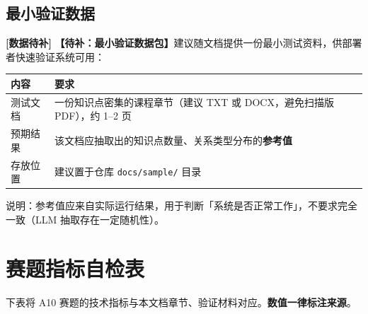 \documentclass[UTF8,a4paper,11pt]{ctexrep}
\newcommand{\todomark}{\textcolor{todobar}{\textbf{[数据待补]}}}
\begin{document}
\subsection{最小验证数据}

\begin{todobox}
\todomark{} \textbf{【待补：最小验证数据包】}建议随文档提供一份最小测试资料，供部署者快速验证系统可用：

\begin{center}
\small
\begin{tabularx}{\linewidth}{@{}XX@{}}
\toprule
内容 & 要求 \\
\midrule
测试文档 & 一份知识点密集的课程章节（建议 TXT 或 DOCX，避免扫描版 PDF），约 1–2 页 \\
预期结果 & 该文档应抽取出的知识点数量、关系类型分布的\textbf{参考值} \\
存放位置 & 建议置于仓库 \texttt{docs/sample/} 目录 \\
\bottomrule
\end{tabularx}
\end{center}
说明：参考值应来自实际运行结果，用于判断「系统是否正常工作」，不要求完全一致（LLM 抽取存在一定随机性）。

\end{todobox}


\section{赛题指标自检表}

下表将 A10 赛题的技术指标与本文档章节、验证材料对应。\textbf{数值一律标注来源}。
\end{document}
